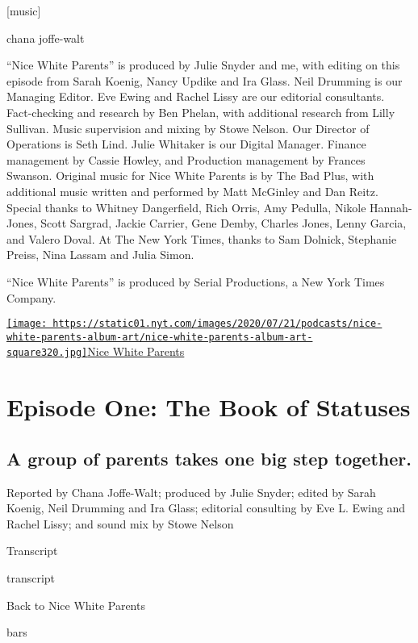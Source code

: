 {[}music{]}

chana joffe-walt

``Nice White Parents'' is produced by Julie Snyder and me, with editing
on this episode from Sarah Koenig, Nancy Updike and Ira Glass. Neil
Drumming is our Managing Editor. Eve Ewing and Rachel Lissy are our
editorial consultants. Fact-checking and research by Ben Phelan, with
additional research from Lilly Sullivan. Music supervision and mixing by
Stowe Nelson. Our Director of Operations is Seth Lind. Julie Whitaker is
our Digital Manager. Finance management by Cassie Howley, and Production
management by Frances Swanson. Original music for Nice White Parents is
by The Bad Plus, with additional music written and performed by Matt
McGinley and Dan Reitz. Special thanks to Whitney Dangerfield, Rich
Orris, Amy Pedulla, Nikole Hannah-Jones, Scott Sargrad, Jackie Carrier,
Gene Demby, Charles Jones, Lenny Garcia, and Valero Doval. At The New
York Times, thanks to Sam Dolnick, Stephanie Preiss, Nina Lassam and
Julia Simon.

``Nice White Parents'' is produced by Serial Productions, a New York
Times Company.

\href{https://www.nytimes.com/column/nice-white-parents}{\texttt{[image: https://static01.nyt.com/images/2020/07/21/podcasts/nice-white-parents-album-art/nice-white-parents-album-art-square320.jpg]}Nice
White Parents}

\hypertarget{episode-one-the-book-of-statuses-1}{%
\section{Episode One: The Book of
Statuses}\label{episode-one-the-book-of-statuses-1}}

\hypertarget{a-group-of-parents-takes-one-big-step-together-1}{%
\subsection{A group of parents takes one big step
together.}\label{a-group-of-parents-takes-one-big-step-together-1}}

Reported by Chana Joffe-Walt; produced by Julie Snyder; edited by Sarah
Koenig, Neil Drumming and Ira Glass; editorial consulting by Eve L.
Ewing and Rachel Lissy; and sound mix by Stowe Nelson

Transcript

transcript

Back to Nice White Parents

bars

